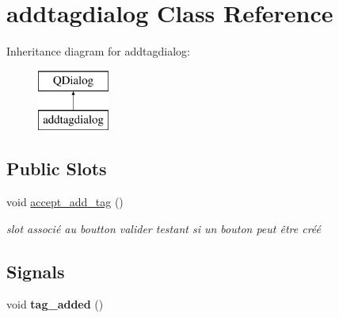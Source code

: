 \hypertarget{classaddtagdialog}{\section{addtagdialog Class Reference}
\label{classaddtagdialog}
}
Inheritance diagram for addtagdialog\-:\begin{figure}[H]
\begin{center}
\leavevmode
\includegraphics[height=2.000000cm]{classaddtagdialog}
\end{center}
\end{figure}
\subsection*{Public Slots}
\begin{DoxyCompactItemize}
\item 
\hypertarget{classaddtagdialog_afaf3ddf489176280fe73325d128d500c}{void \hyperlink{classaddtagdialog_afaf3ddf489176280fe73325d128d500c}{accept\-\_\-add\-\_\-tag} ()}\label{classaddtagdialog_afaf3ddf489176280fe73325d128d500c}

\begin{DoxyCompactList}\small\item\em slot associé au boutton valider testant si un bouton peut être créé \end{DoxyCompactList}\end{DoxyCompactItemize}
\subsection*{Signals}
\begin{DoxyCompactItemize}
\item 
\hypertarget{classaddtagdialog_aef3fda151058d8a0600873ca2f557d92}{void {\bfseries tag\-\_\-added} ()}\label{classaddtagdialog_aef3fda151058d8a0600873ca2f557d92}

\end{DoxyCompactItemize}
